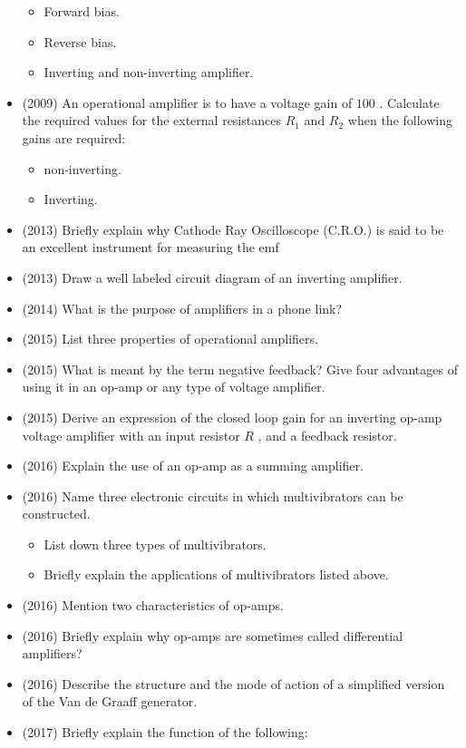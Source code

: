 \documentclass{article}
\begin{document}
\begin{itemize}
 \begin{itemize}
\item Forward bias.
\item Reverse bias.
\item Inverting and non-inverting amplifier. 
\end{itemize}
\item (2009)  An operational amplifier is to have a voltage gain of $ 100$ .  Calculate the required values for the external resistances $ R_{1}$ and $ R_{2}$ when the following gains are required:
 \begin{itemize}
\item non-inverting.
\item Inverting.
\end{itemize}
\item (2013)  Briefly explain why Cathode Ray Oscilloscope (C.R.O.) is said to be an excellent instrument for measuring the emf 
\item (2013)  Draw a well labeled circuit diagram of an inverting amplifier.
\item (2014)  What is the purpose of amplifiers in a phone link? 
\item (2015)  List three properties of operational amplifiers.
\item (2015)  What is meant by the term negative feedback? Give four advantages of using it in an op-amp or any type of voltage amplifier.
\item (2015)  Derive an expression of the closed loop gain for an inverting op-amp voltage amplifier with an input resistor $ R$ , and a feedback resistor.
\item (2016)  Explain the use of an op-amp as a summing amplifier.
\item (2016)  Name three electronic circuits in which multivibrators can be constructed.
 \begin{itemize}
\item List down three types of multivibrators.
\item Briefly explain the applications of multivibrators listed above.
\end{itemize}
\item (2016)  Mention two characteristics of op-amps.
\item (2016)  Briefly explain why op-amps are sometimes called differential amplifiers?
\item (2016)  Describe the structure and the mode of action of a simplified version of the Van de Graaff generator.
\item (2017)  Briefly explain the function of the following:

\end{itemize}
\end{document}
